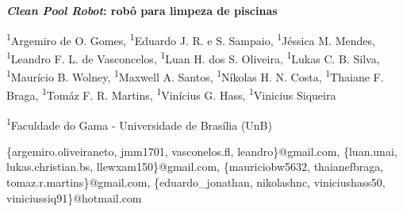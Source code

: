 \begin{report-title}
\textbf{\textit{Clean Pool Robot}: robô para limpeza de piscinas}
\end{report-title}

\begin{author-list}
\textsuperscript{1}Argemiro de O. Gomes,
\textsuperscript{1}Eduardo J. R. e S. Sampaio,
\textsuperscript{1}Jéssica M. Mendes,
\textsuperscript{1}Leandro F. L. de Vasconcelos,
\textsuperscript{1}Luan H. dos S. Oliveira,
\textsuperscript{1}Lukas C. B. Silva,
\textsuperscript{1}Maurício B. Wolney,
\textsuperscript{1}Maxwell A. Santos,
\textsuperscript{1}Níkolas H. N. Costa,
\textsuperscript{1}Thaiane F. Braga,
\textsuperscript{1}Tomáz F. R. Martins,
\textsuperscript{1}Vinícius G. Hass,
\textsuperscript{1}Vinicius Siqueira
\end{author-list}

\begin{author-address}
\textsuperscript{1}Faculdade do Gama - Universidade de Brasília (UnB)
\end{author-address}

\begin{e-mails}
\{argemiro.oliveiraneto, jmm1701, vasconelos.fl, leandro\}@gmail.com,
\{luan.unai, lukas.christian.bs, llewxam150\}@gmail.com,
\{mauriciobw5632, thaianefbraga, tomaz.r.martins\}@gmail.com,
\{eduardo\_jonathan, nikolashnc, viniciushass50, viniciussiq91\}@hotmail.com
\end{e-mails}
